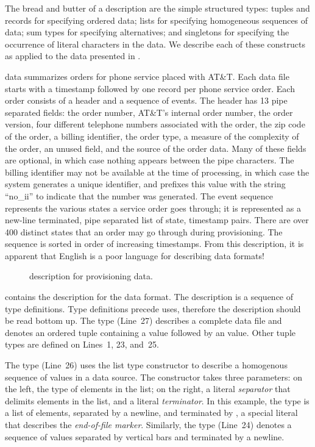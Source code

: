 The bread and butter of a \padsml{} description are the simple
structured types: tuples and records for specifying ordered data;
lists for specifying homogeneous sequences of data; sum types for
specifying alternatives; and singletons for specifying the occurrence
of literal characters in the data.  We describe each of these
constructs as applied to the \dibbler{} data presented in
.

\dibbler{} data summarizes orders for phone service placed with AT\&T.
Each \dibbler{} data file starts with a timestamp followed by one
record per phone service order.  Each order consists of a header and a
sequence of events.  The header has 13 pipe separated fields: the
order number, AT\&T's internal order number, the order version, four
different telephone numbers associated with the order, the zip code of
the order, a billing identifier, the order type, a measure of the
complexity of the order, an unused field, and the source of the order
data.  Many of these fields are optional, in which case nothing
appears between the pipe characters.  The billing identifier may not
be available at the time of processing, in which case the system
generates a unique identifier, and prefixes this value with the string
``no\_ii'' to indicate that the number was generated. The event
sequence represents the various states a service order goes through;
it is represented as a new-line terminated, pipe separated list of
state, timestamp pairs.  There are over 400 distinct states that an
order may go through during provisioning.  The sequence is sorted in
order of increasing timestamps.  From this description, it is apparent
that English is a poor language for describing data formats!

\begin{figure}

  \caption{\padsml{} description for \dibbler{} provisioning data.}
  \label{figure:sirius_pml}
\end{figure}

 contains the \padsml{} description for the
\dibbler{} data format.  The description is a sequence of type
definitions.  Type definitions precede uses, therefore the description
should be read bottom up.
The type  (Line~27) describes a complete \dibbler{} data
file and denotes an ordered tuple containing a
 value followed by an  value.
Other tuple types are defined on Lines~1, 23, and~25.

The type  (Line~26) uses the list type constructor
 to describe a homogenous sequence of values in a data
source.  The  constructor takes three parameters: on the
left, the type of elements in the list; on the right, a literal
\emph{separator} that delimits elements in the list, and a literal
\emph{terminator}.  In this example, the type  is a list of
 elements, separated by a newline, and terminated by
, a special literal that describes the \emph{end-of-file
  marker}.  Similarly, the  type (Line~24) denotes a
sequence of  values separated by vertical bars and
terminated by a newline.

